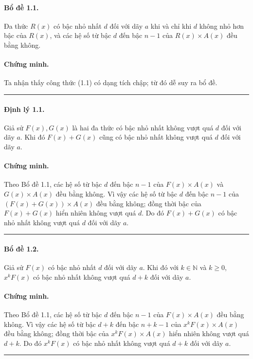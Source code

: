 \documentclass[11pt]{article}
\newcommand{\qedmark}{\hfill\rule{0.7ex}{0.7ex}}
\begin{document}
\paragraph{Bổ đề 1.1.}
Đa thức \(R(x)\) có bậc nhỏ nhất \(d\) đối với dãy \(a\) khi và chỉ khi \(d\)
không nhỏ hơn bậc của \(R(x)\), và các hệ số từ bậc \(d\) đến bậc \(n-1\) của
\(R(x)\times A(x)\) đều bằng không.

\paragraph{Chứng minh.}
Ta nhận thấy công thức (1.1) có dạng tích chập; từ đó dễ suy ra bổ đề.
\qedmark

\paragraph{Định lý 1.1.}
Giả sử \(F(x),G(x)\) là hai đa thức có bậc nhỏ nhất không vượt quá \(d\) đối
với dãy \(a\). Khi đó \(F(x)+G(x)\) cũng có bậc nhỏ nhất không vượt quá \(d\)
đối với dãy \(a\).

\paragraph{Chứng minh.}
Theo Bổ đề 1.1, các hệ số từ bậc \(d\) đến bậc \(n-1\) của
\(F(x)\times A(x)\) và \(G(x)\times A(x)\) đều bằng không. Vì vậy các hệ số từ
bậc \(d\) đến bậc \(n-1\) của \((F(x)+G(x))\times A(x)\) đều bằng không; đồng
thời bậc của \(F(x)+G(x)\) hiển nhiên không vượt quá \(d\). Do đó \(F(x)+G(x)\)
có bậc nhỏ nhất không vượt quá \(d\) đối với dãy \(a\). \qedmark

\paragraph{Bổ đề 1.2.}
Giả sử \(F(x)\) có bậc nhỏ nhất \(d\) đối với dãy \(a\). Khi đó với
\(k\in\mathbb{N}\) và \(k\ge 0\), \(x^kF(x)\) có bậc nhỏ nhất không vượt quá
\(d+k\) đối với dãy \(a\).

\paragraph{Chứng minh.}
Theo Bổ đề 1.1, các hệ số từ bậc \(d\) đến bậc \(n-1\) của \(F(x)\times A(x)\)
đều bằng không. Vì vậy các hệ số từ bậc \(d+k\) đến bậc \(n+k-1\) của
\(x^kF(x)\times A(x)\) đều bằng không; đồng thời bậc của \(x^kF(x)\times A(x)\)
hiển nhiên không vượt quá \(d+k\). Do đó \(x^kF(x)\) có bậc nhỏ nhất không
vượt quá \(d+k\) đối với dãy \(a\). \qedmark
\end{document}
